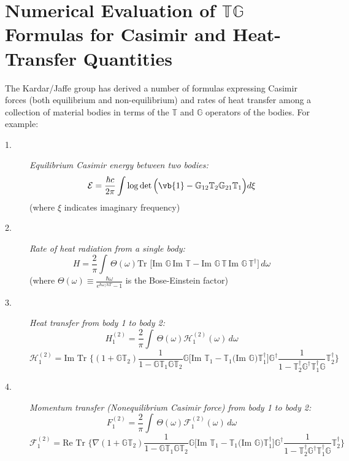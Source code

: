 \documentclass[letterpaper]{article}
\newcommand{\TT}{\mathbb{T}}
\newcommand{\GG}{\mathbb{G}}
\newcommand{\im}{\text{Im }}
\begin{document}
\newpage
\section{Numerical Evaluation of $\mathbb{T}\mathbb{G}$ Formulas
         for Casimir and Heat-Transfer Quantities}

The Kardar/Jaffe group has derived a number of formulas expressing
Casimir forces (both equilibrium and non-equilibrium) and
rates of heat transfer among a collection of material bodies 
in terms of the $\TT$ and $\GG$ operators of the
bodies. For example:
\begin{description}
 \item[1.] \textit{Equilibrium Casimir energy between two bodies:}
 $$\mathcal{E}=\frac{\hbar c}{2\pi}\int
   \log\det\Big(\vb{1} - \GG_{12}\mathbb{T}_2\GG_{21}\mathbb{T}_1\Big)
   d\xi
 $$
(where $\xi$ indicates imaginary frequency)
 \item[2.] \textit{Rate of heat radiation from a single body:}
 $$H=\frac{2}{\pi}
   \int \,\Theta(\omega) 
   \text{Tr }
   \Big[   \text{Im }\GG \, \text{Im }\TT 
         - \text{Im }\GG \, \TT \,
           \text{Im }\GG\, \TT^\dagger 
   \Big] \, d\omega
 $$
(where $\Theta(\omega)\equiv \frac{\hbar\omega}{e^{\hbar\omega/kT} - 1}$
 is the Bose-Einstein factor)
 \item[3.] \textit{Heat transfer from body 1 to body 2:}
 $$H_1^{(2)}=\frac{2}{\pi}
   \int \,\Theta(\omega) \mathcal{H}_1^{(2)}(\omega)\,d\omega
 $$
 $$\mathcal{H}_1^{(2)}=\text{Im Tr }
   \bigg\{ (1 + \GG \TT_2) \frac{1}{1-\GG \TT_1 \GG \TT_2}
           \GG 
           \Big[ \im \TT_1 - \TT_1 \big(\im \GG\big) \TT_1^\dagger \Big] 
           \GG^\dagger
           \frac{1}{1-\TT_2^\dagger \GG^\dagger \TT_1^\dagger \GG}\TT_2^\dagger
   \bigg\}
 $$
 \item[4.] \textit{Momentum transfer (Nonequilibrium Casimir force) from body 1 to body 2:}
 $$F_1^{(2)}=\frac{2}{\pi}
   \int \,\Theta(\omega) \mathcal{F}_1^{(2)}(\omega)\,d\omega
 $$
 $$\mathcal{F}_1^{(2)}=\text{Re Tr }
   \bigg\{ \nabla (1 + \GG \TT_2) 
           \frac{1}{1-\GG \TT_1 \GG \TT_2}
           \GG 
           \Big[ \im \TT_1 - \TT_1 \big(\im \GG\big) \TT_1^\dagger \Big] 
           \GG^\dagger
           \frac{1}{1-\TT_2^\dagger \GG^\dagger \TT_1^\dagger \GG}
           \TT_2^\dagger
   \bigg\}
 $$
\end{description}
\end{document}
